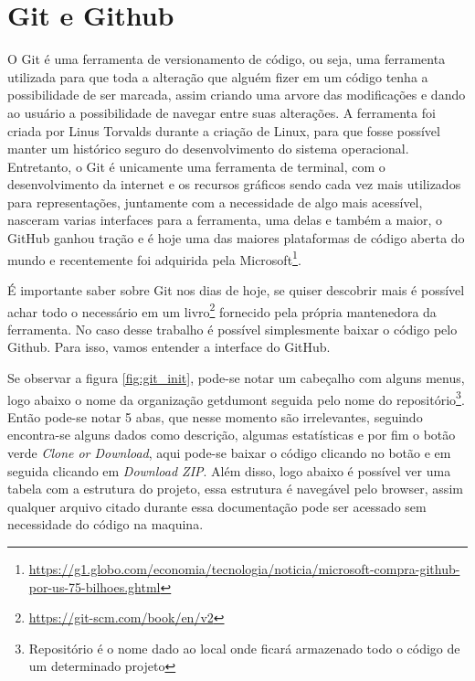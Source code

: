 \chapter{Git e Github}
O Git é uma ferramenta de versionamento de código, ou seja, uma ferramenta utilizada para que toda a alteração que alguém fizer em um código tenha a possibilidade de ser marcada, assim criando uma arvore das modificações e dando ao usuário a possibilidade de navegar entre suas alterações. A ferramenta foi criada por Linus Torvalds durante a criação de Linux, para que fosse possível manter um histórico seguro do desenvolvimento do sistema operacional. Entretanto, o Git é unicamente uma ferramenta de terminal, com o desenvolvimento da internet e os recursos gráficos sendo cada vez mais utilizados para representações, juntamente com a necessidade de algo mais acessível, nasceram varias interfaces para a ferramenta, uma delas e também a maior, o GitHub ganhou tração e é hoje uma das maiores plataformas de código aberta do mundo e recentemente foi adquirida pela Microsoft\footnote{\url{https://g1.globo.com/economia/tecnologia/noticia/microsoft-compra-github-por-us-75-bilhoes.ghtml}}.

É importante saber sobre Git nos dias de hoje, se quiser descobrir mais é possível achar todo o necessário em um livro\footnote{\url{https://git-scm.com/book/en/v2}} fornecido pela própria mantenedora da ferramenta. No caso desse trabalho é possível simplesmente baixar o código pelo Github. Para isso, vamos entender a interface do GitHub.

Se observar a figura \ref{fig:git_init}, pode-se notar um cabeçalho com alguns menus, logo abaixo o nome da organização getdumont seguida pelo nome do repositório\footnote{Repositório é o nome dado ao local onde ficará armazenado todo o código de um determinado projeto}. Então pode-se notar 5 abas, que nesse momento são irrelevantes, seguindo encontra-se alguns dados como descrição, algumas estatísticas e por fim o botão verde \textit{Clone or Download}, aqui pode-se baixar o código clicando no botão e em seguida clicando em \textit{Download ZIP}. Além disso, logo abaixo é possível ver uma tabela com a estrutura do projeto, essa estrutura é navegável pelo browser, assim qualquer arquivo citado durante essa documentação pode ser acessado sem necessidade do código na maquina.

